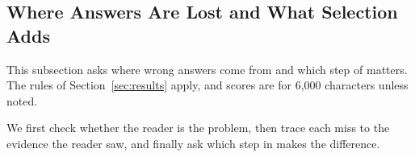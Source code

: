 

\subsection{Where Answers Are Lost and What Selection Adds}
\label{sec:lost}
This subsection asks where wrong answers come from and which step of \lexb{} matters. The rules of Section~\ref{sec:results} apply, and scores are for 6,000 characters unless noted.

We first check whether the reader is the problem, then trace each miss to the evidence the reader saw, and finally ask which step in \lexb{} makes the difference.

